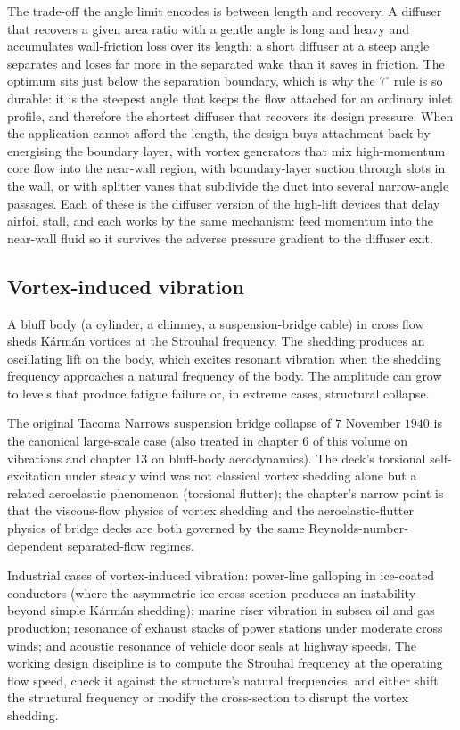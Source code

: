 The trade-off the angle limit encodes is between length and recovery.
A diffuser that recovers a given area ratio with a gentle angle is
long and heavy and accumulates wall-friction loss over its length; a
short diffuser at a steep angle separates and loses far more in the
separated wake than it saves in friction. The optimum sits just below
the separation boundary, which is why the $7^{\circ}$ rule is so
durable: it is the steepest angle that keeps the flow attached for an
ordinary inlet profile, and therefore the shortest diffuser that
recovers its design pressure. When the application cannot afford the
length, the design buys attachment back by energising the boundary
layer, with vortex generators that mix high-momentum core flow into
the near-wall region, with boundary-layer suction through slots in the
wall, or with splitter vanes that subdivide the duct into several
narrow-angle passages. Each of these is the diffuser version of the
high-lift devices that delay airfoil stall, and each works by the same
mechanism: feed momentum into the near-wall fluid so it survives the
adverse pressure gradient to the diffuser exit.

\subsection{Vortex-induced vibration}

A bluff body (a cylinder, a chimney, a suspension-bridge cable) in
cross flow sheds Kármán vortices at the Strouhal frequency. The
shedding produces an oscillating lift on the body, which excites
resonant vibration when the shedding frequency approaches a
natural frequency of the body. The amplitude can grow to levels
that produce fatigue failure or, in extreme cases, structural
collapse.

The original Tacoma Narrows suspension bridge collapse of
$7$ November $1940$ \cite{acc:tacoma-narrows-1941} is the
canonical large-scale case (also treated in chapter 6 of this
volume on vibrations and chapter 13 on bluff-body aerodynamics).
The deck's torsional self-excitation under steady wind was not
classical vortex shedding alone but a related aeroelastic
phenomenon (torsional flutter); the chapter's narrow point is
that the viscous-flow physics of vortex shedding and the
aeroelastic-flutter physics of bridge decks are both governed by
the same Reynolds-number-dependent separated-flow regimes.

Industrial cases of vortex-induced vibration: power-line galloping
in ice-coated conductors (where the asymmetric ice cross-section
produces an instability beyond simple Kármán shedding); marine
riser vibration in subsea oil and gas production; resonance of
exhaust stacks of power stations under moderate cross winds; and
acoustic resonance of vehicle door seals at highway speeds. The
working design discipline is to compute the Strouhal frequency at
the operating flow speed, check it against the structure's natural
frequencies, and either shift the structural frequency or modify
the cross-section to disrupt the vortex shedding.

